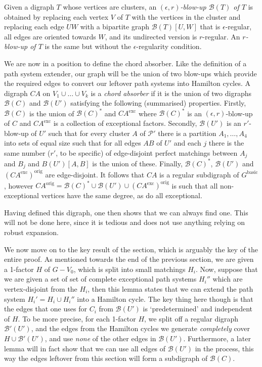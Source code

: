 \documentclass[10pt,letterpaper, reqno]{amsart}
\theoremstyle{definition}
\numberwithin{equation}{section}
\begin{document}
Given a digraph $T$ whose vertices are clusters, an \textit{$(\epsilon,r)$-blow-up $\mathcal{B}(T)$ of $T$} is obtained by replacing each vertex $V$ of $T$ with the vertices in the cluster and replacing each edge $UW$ with a bipartite graph $\mathcal{B}(T)[U,W]$ that is $\epsilon$-regular, all edges are oriented towards $W$, and its undirected version is $r$-regular. An \textit{$r$-blow-up of $T$} is the same but without the $\epsilon$-regularity condition. 

We are now in a position to define the chord absorber. Like the definition of a path system extender, our graph will be the union of two blow-ups which provide the required edges to convert our leftover path systems into Hamilton cycles. A digraph $CA$ on $V_1 \cup \dots \cup V_k$ is a \textit{chord absorber} if it is the union of two digraphs $\mathcal{B}(C)$ and $\mathcal{B}(U')$ satisfying the following (summarised) properties. Firstly, $\mathcal{B}(C)$ is the union of $\mathcal{B}(C)^*$ and $CA^\text{exc}$ where $\mathcal{B}(C)^*$ is an $(\epsilon,r)$-blow-up of $C$ and $CA^\text{exc}$ is a collection of exceptional factors. Secondly, $\mathcal{B}(U')$ is an $r'$-blow-up of $U'$ such that for every cluster $A$ of $\mathcal{P}'$ there is a partition $A_1,\dots, A_4$ into sets of equal size such that for all edges $AB$ of $U'$ and each $j$ there is the same number ($r'$, to be specific) of edge-disjoint perfect matchings between $A_j$ and $B_j$ and $B(U')[A,B]$ is the union of these. Finally, $\mathcal{B}(C)^*$, $\mathcal{B}(U')$ and $(CA^\text{exc})^\text{orig}$ are edge-disjoint. It follows that $CA$ is a regular subdigraph of $G^\text{basic}$, however $CA^\text{orig} = \mathcal{B}(C)^*\cup \mathcal{B}(U') \cup (CA^\text{exc})^\text{orig}$ is such that all non-exceptional vertices have the same degree, as do all exceptional. 

Having defined this digraph, one then shows that we can always find one. This will not be done here, since it is tedious and does not use anything relying on robust expansion.

We now move on to the key result of the section, which is arguably the key of the entire proof. As mentioned towards the end of the previous section, we are given a 1-factor $H$ of $G-V_0$, which is split into small matchings $H_i$. Now, suppose that we are given a set of set of complete exceptional path systems $H_i''$ which are vertex-disjoint from the $H_i$, then this lemma states that we can extend the path system $H_i' = H_i \cup H_i''$ into a Hamilton cycle. The key thing here though is that the edges that one uses for $C_i$ from $\mathcal{B}(U')$ is `predetermined' and independent of $H$. To be more precise, for each 1-factor $H$, we split off a regular digraph $\mathcal{B}'(U')$, and the edges from the Hamilton cycles we generate \textit{completely} cover $H \cup \mathcal{B}'(U')$, and use \textit{none} of the other edges in $\mathcal{B}(U')$. Furthermore, a later lemma will in fact show that we can use all edges of $\mathcal{B}(U')$ in the process, this way the edges leftover from this section will form a subdigraph of $\mathcal{B}(C)$.
\end{document}
